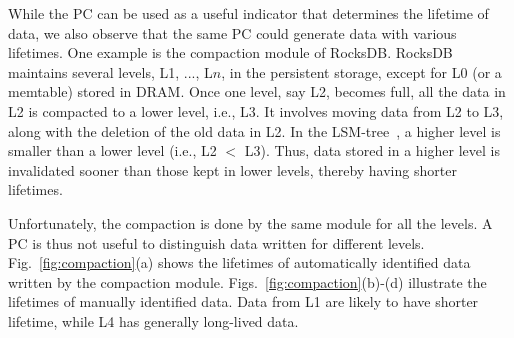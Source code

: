 While the PC can be used as a useful indicator that determines the lifetime of
data, we also observe that the same PC could generate data with various
lifetimes. One example is the compaction module of RocksDB. RocksDB maintains
several levels, L1, ..., L$n$, in the persistent storage, except for L0 (or a
memtable) stored in DRAM.  Once one level, say L2, becomes full, all the data
in L2 is compacted to a lower level, i.e., L3.  It involves moving data from L2
to L3, along with the deletion of the old data in L2.  In the
LSM-tree~\cite{LSM}, a higher level is smaller than a lower level (i.e., L2 $<$
L3). Thus, data stored in a higher level is invalidated sooner than those kept
in lower levels, thereby having shorter lifetimes.



Unfortunately, the compaction is done by the same module for all the levels.
A PC is thus not useful to distinguish data written for different levels.
Fig.~\ref{fig:compaction}(a) shows the lifetimes of automatically identified data written by the
compaction module. 
Figs.~\ref{fig:compaction}(b)-(d) illustrate the lifetimes
of manually identified data.
Data from L1 are likely to have shorter lifetime, while L4 has generally
long-lived data.

